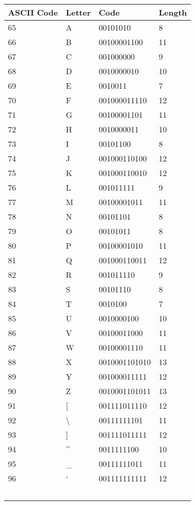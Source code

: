 \documentclass[]{article}
\begin{document}
\begin{center}
	\begin{tabular}{ | l | l | l | l |} \hline
		﻿\textbf{ASCII Code} & ﻿\textbf{Letter} & ﻿\textbf{Code} & ﻿\textbf{Length} \\ \hline
	65 & A & 00101010 & 8 \\ \hline
	66 & B & 00100001100 & 11 \\ \hline
	67 & C & 001000000 & 9 \\ \hline
	68 & D & 0010000010 & 10 \\ \hline
	69 & E & 0010011 & 7 \\ \hline
	70 & F & 001000011110 & 12 \\ \hline
	71 & G & 00100001101 & 11 \\ \hline
	72 & H & 0010000011 & 10 \\ \hline
	73 & I & 00101100 & 8 \\ \hline
	74 & J & 001000110100 & 12 \\ \hline
	75 & K & 001000110010 & 12 \\ \hline
	76 & L & 001011111 & 9 \\ \hline
	77 & M & 00100001011 & 11 \\ \hline
	78 & N & 00101101 & 8 \\ \hline
	79 & O & 00101011 & 8 \\ \hline
	80 & P & 00100001010 & 11 \\ \hline
	81 & Q & 001000110011 & 12 \\ \hline
	82 & R & 001011110 & 9 \\ \hline
	83 & S & 00101110 & 8 \\ \hline
	84 & T & 0010100 & 7 \\ \hline
	85 & U & 0010000100 & 10 \\ \hline
	86 & V & 00100011000 & 11 \\ \hline
	87 & W & 00100001110 & 11 \\ \hline
	88 & X & 0010001101010 & 13 \\ \hline
	89 & Y & 001000011111 & 12 \\ \hline
	90 & Z & 0010001101011 & 13 \\ \hline
	91 & [ & 001111011110 & 12 \\ \hline
	92 & \textbackslash & 00111111101 & 11 \\ \hline
	93 & ] & 001111011111 & 12 \\ \hline
	94 & \^{} & 0011111100 & 10 \\ \hline
	95 & \_ & 00111111011 & 11 \\ \hline
	96 & ` & 001111111111 & 12 \\ \hline
	﻿\end{tabular}
\end{center}
\end{document}

